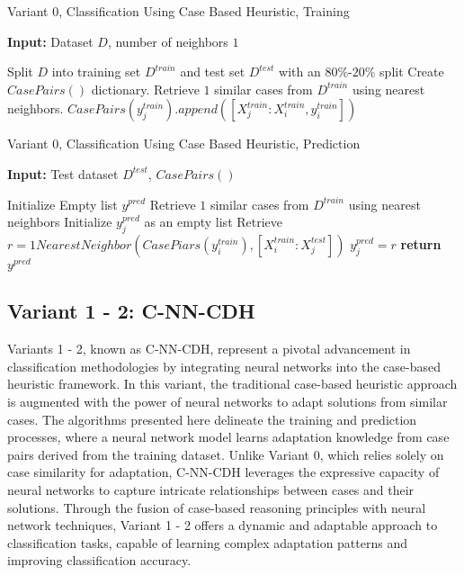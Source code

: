 \documentclass[a4paper, 12pt]{report}
\begin{document}
\begin{algorithm}
    \caption{Variant 0, Classification Using Case Based Heuristic, Training}
    \label{alg:Classification_using_CBH_train_alg5}
    \textbf{Input:} Dataset $D$, number of neighbors $1$
    \begin{algorithmic}
        \State Split $D$ into training set $D^{train}$ and test set $D^{test}$ with an $80\%$-$20\%$ split
        \State Create $CasePairs()$ dictionary.
            \State Retrieve $1$ similar cases from $D^{train}$ using nearest neighbors.
                \State $CasePairs(y^{train}_j).append([X^{train}_j:X^{train}_i, y^{train}_i])$
            \EndFor
        \EndFor
    \end{algorithmic}
\end{algorithm}

\begin{algorithm}
    \caption{Variant 0, Classification Using Case Based Heuristic, Prediction}
    \label{alg:Classification_using_CBH_predict_alg6}
    \textbf{Input:} Test dataset $D^{test}$, $CasePairs()$
    \begin{algorithmic}[1]
        \State Initialize Empty list $y^{pred}$
            \State Retrieve $1$ similar cases from $D^{train}$ using nearest neighbors
            \State Initialize $y^{pred}_j$ as an empty list
                \State Retrieve $r = 1NearestNeighbor(CasePiars(y^{train}_i), [X^{train}_i:X^{test}_j])$
                \State $y^{pred}_j = r$
            \EndFor
        \EndFor
        \State \textbf{return} $y^{pred}$
    \end{algorithmic}
\end{algorithm}

\subsection{Variant 1 - 2: C-NN-CDH}

Variants 1 - 2, known as C-NN-CDH, represent a pivotal advancement in classification methodologies by integrating neural networks into the case-based heuristic framework. 
In this variant, the traditional case-based heuristic approach is augmented with the power of neural networks to adapt solutions from similar cases. 
The algorithms presented here delineate the training and prediction processes, where a neural network model learns adaptation knowledge from case pairs derived from the training dataset. 
Unlike Variant 0, which relies solely on case similarity for adaptation, C-NN-CDH leverages the expressive capacity of neural networks to capture intricate relationships between cases and their solutions. 
Through the fusion of case-based reasoning principles with neural network techniques, Variant 1 - 2 offers a dynamic and adaptable approach to classification tasks, capable of learning complex adaptation patterns and improving classification accuracy.
\end{document}
